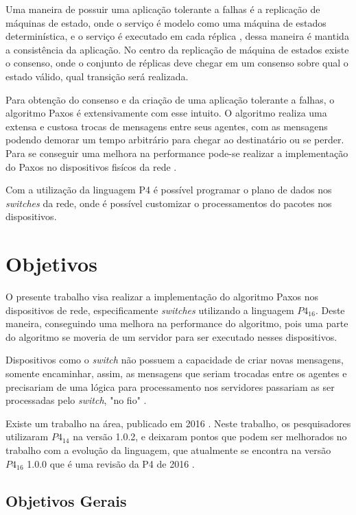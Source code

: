 \documentclass[12pt,
openright, 
oneside,
a4paper,
brazil]{facom-ufu-abntex2}
\begin{document}
Uma maneira de possuir uma aplicação tolerante a falhas é a replicação de máquinas
de estado, onde o serviço é modelo como uma máquina de estados determinística, e o
serviço é executado em cada réplica \citep{santos2012state}, dessa maneira é mantida
a consistência da aplicação. No centro da replicação de máquina de estados existe o 
consenso, onde o conjunto de réplicas deve chegar em um consenso sobre qual o estado 
válido, qual transição será realizada. 

Para obtenção do consenso e da criação de uma aplicação tolerante a falhas, o algoritmo
Paxos é extensivamente com esse intuito. O algoritmo realiza uma extensa e custosa 
trocas de mensagens entre seus agentes, com as mensagens podendo demorar um tempo 
arbitrário para chegar ao destinatário ou se perder. Para se conseguir uma melhora na
performance pode-se realizar a implementação do Paxos no dispositivos fisícos da rede
\citep{dang2016paxos}.

Com a utilização da linguagem P4 é possível programar o plano de dados nos 
\textit{switches} da rede, onde é possível customizar o processamentos do pacotes
nos dispositivos. 


\section{Objetivos}
O presente trabalho visa realizar a implementação do algoritmo Paxos nos dispositivos
de rede, especificamente \textit{switches} utilizando a linguagem $P4_{16}$. 
Deste maneira, conseguindo uma melhora na performance do algoritmo, pois uma parte 
do algoritmo se moveria de um servidor para ser executado nesses dispositivos.

Dispositivos como o \textit{switch} não possuem a capacidade de criar novas mensagens,
somente encaminhar, assim, as mensagens que seriam trocadas entre os agentes e precisariam
de uma lógica para processamento nos servidores passariam as ser processadas pelo 
\textit{switch}, "no fio" \citep{dang2016paxos}.

Existe um trabalho na área, publicado em 2016 \citep{dang2016paxos}. Neste trabalho,
os pesquisadores utilizaram $P4_{14}$ na versão 1.0.2, e deixaram pontos que podem ser
melhorados no trabalho com a evolução da linguagem, que atualmente se encontra na versão
$P4_{16}$ 1.0.0 que é uma revisão da P4 de 2016 \citep{paxos16spec}.

\subsection{Objetivos Gerais}
\end{document}
